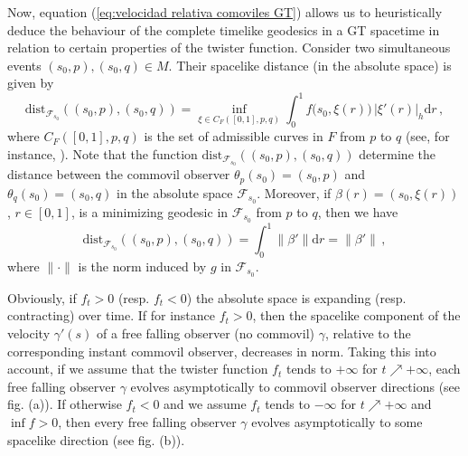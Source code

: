 \documentclass[12pt]{article}
\newcommand{\diff}{\mathrm{d}}
\def\f{\mathcal F}
\begin{document}
Now, equation (\ref{eq:velocidad relativa comoviles GT}) allows us to heuristically deduce the behaviour of the complete timelike geodesics in a GT spacetime in relation to certain properties of the twister function.
Consider two simultaneous events $(s_0,p), (s_0,q) \in M$. Their spacelike distance (in the absolute space) is given by
\begin{equation}\label{eq:Galilean distance}
    \text{dist}_{\f_{s_0}}(({s_0},p),({s_0},q))=\inf_{\xi\in C_{F}([0,1],p,q)} \int_0^1 f\big({s_0},\xi(r)\big)\, \big|\xi'(r)\big|_h \diff r\,,
\end{equation}
where $C_F([0,1],p,q)$ is the set of admissible curves in $F$ from $p$ to $q$ (see, for instance, \cite{DoCarmo-Riemannian}). Note that the function  $\text{dist}_{\f_{s_0}}(({s_0},p),({s_0},q))$ determine the distance between the commovil observer $\theta_p({s_0})=({s_0},p)$ and $\theta_q({s_0})=({s_0},q)$ in the absolute space $\f_{s_0}$. Moreover, if $\beta(r) = (s_0, \xi(r))$, $r\in [0,1]$, is a minimizing geodesic in $\f_{s_0}$ from $p$ to $q$, then we have
\begin{equation}\label{eq:Galilean distance geodesic}
    \text{dist}_{\f_{s_0}}(({s_0},p),({s_0},q))=  \int_0^1 \|\beta'\| \diff r = \|\beta'\|\,,
\end{equation}
where $\| \cdot \|$ is the norm induced by $g$ in $\f_{s_0}$.

Obviously, if $f_t>0$ (resp. $f_t<0$) the absolute space is expanding (resp. contracting) over time. If for instance $f_t>0$, then the spacelike component of the velocity $\gamma'(s)$ of a free falling observer (no commovil) $\gamma$, relative to the corresponding instant commovil observer, decreases in norm. Taking this into account, if we assume that the twister function $f_t$ tends to $+\infty$ for $t\nearrow +\infty$, each free falling observer $\gamma$ evolves asymptotically to commovil observer directions (see fig. (a)). If otherwise $f_t<0$ and we assume $f_t$ tends to $-\infty$ for $t\nearrow +\infty$ and $\inf f>0$, then every free falling  observer $\gamma$ evolves asymptotically to some spacelike direction (see fig. (b)).
\end{document}
